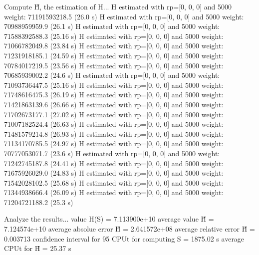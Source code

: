 Compute H̃, the estimation of H...
  H estimated with rp=[0, 0, 0] and 5000 weight:  71191593218.5  (26.0 s)
  H estimated with rp=[0, 0, 0] and 5000 weight:  70988959959.9  (26.1 s)
  H estimated with rp=[0, 0, 0] and 5000 weight:  71588392588.3  (25.16 s)
  H estimated with rp=[0, 0, 0] and 5000 weight:  71066782049.8  (23.84 s)
  H estimated with rp=[0, 0, 0] and 5000 weight:  71231918185.1  (24.59 s)
  H estimated with rp=[0, 0, 0] and 5000 weight:  70784017219.5  (23.56 s)
  H estimated with rp=[0, 0, 0] and 5000 weight:  70685939002.2  (24.6 s)
  H estimated with rp=[0, 0, 0] and 5000 weight:  71093736447.5  (25.16 s)
  H estimated with rp=[0, 0, 0] and 5000 weight:  71748616475.3  (26.19 s)
  H estimated with rp=[0, 0, 0] and 5000 weight:  71421863139.6  (26.66 s)
  H estimated with rp=[0, 0, 0] and 5000 weight:  71702673177.1  (27.02 s)
  H estimated with rp=[0, 0, 0] and 5000 weight:  71007182524.4  (26.63 s)
  H estimated with rp=[0, 0, 0] and 5000 weight:  71481579214.8  (26.93 s)
  H estimated with rp=[0, 0, 0] and 5000 weight:  71134170785.5  (24.97 s)
  H estimated with rp=[0, 0, 0] and 5000 weight:  70777053071.7  (23.6 s)
  H estimated with rp=[0, 0, 0] and 5000 weight:  71242745187.8  (24.41 s)
  H estimated with rp=[0, 0, 0] and 5000 weight:  71675926029.0  (24.83 s)
  H estimated with rp=[0, 0, 0] and 5000 weight:  71542028102.5  (25.68 s)
  H estimated with rp=[0, 0, 0] and 5000 weight:  71344938666.4  (26.09 s)
  H estimated with rp=[0, 0, 0] and 5000 weight:  71204721188.2  (25.3 s)

Analyze the results...
  value H(S)                  = 7.113900e+10 
  average value H̃             = 7.124574e+10 
  average absolue error H̃     = 2.641572e+08 
  average relative error H̃    = 0.003713 
  confidence interval for 95%
  CPUt for computing S         = 1875.02 s
  average CPUt for H̃           = 25.37 s

